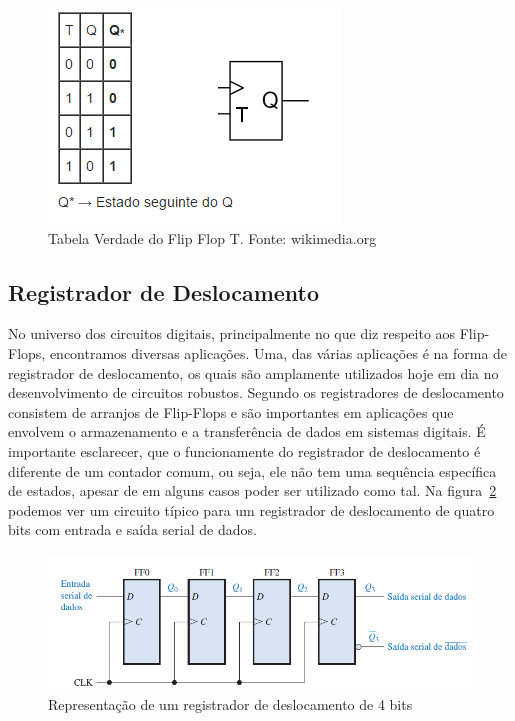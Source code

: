 \documentclass[12pt]{article}
\begin{document}
\begin{figure}[h]
\centering
\includegraphics[width=.5\textwidth]{img/fig4Flip-Flopt.png}
\caption{Tabela Verdade do Flip Flop T. Fonte: wikimedia.org}
\label{fig:fft}
\end{figure}

\subsection{Registrador de Deslocamento}
No universo dos circuitos digitais, principalmente no que diz respeito aos Flip-Flops, encontramos diversas aplicações. Uma, das várias aplicações é na forma de registrador de deslocamento, os quais são amplamente utilizados hoje em dia no desenvolvimento de circuitos robustos. Segundo \cite{floyd2011digital} os registradores de deslocamento consistem de arranjos de Flip-Flops e são importantes em aplicações que envolvem o armazenamento e a transferência de dados em sistemas digitais. É importante esclarecer, que o funcionamente do registrador de deslocamento é diferente de um contador comum, ou seja, ele não tem uma sequência específica de estados, apesar de em alguns casos poder ser utilizado como tal. Na figura~\ref{fig:rdeslocamento} podemos ver um circuito típico para um registrador de deslocamento de quatro bits com entrada e saída serial de dados.

\begin{figure}[h]
\centering
\includegraphics[width=.7\textwidth]{img/Fig5RegistradorDeslocamento.png}
\caption{Representação de um registrador de deslocamento de 4 bits \cite{floyd2011digital}}
\label{fig:rdeslocamento}
\end{figure}
\end{document}

